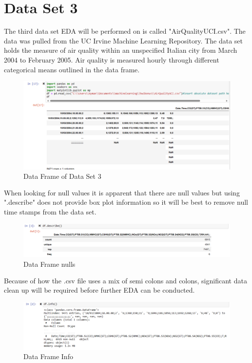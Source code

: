 \documentclass{article}
\begin{document}
\section{Data Set 3}
The third data set EDA will be performed on is called "AirQualityUCI.csv". 
The data was pulled from the UC Irvine Machine Learning Repository. The data set holds the measure of air quality within an unspecified Italian city from March 2004 to February 2005. Air quality is measured hourly through different categorical means outlined in the data frame.
\begin{figure}
    \centering
    \includegraphics[width=0.5\linewidth]{d.png}
    \caption{Data Frame of Data Set 3}
    \label{fig:enter-label}
\end{figure}
When looking for null values it is apparent that there are null values but using ".describe" does not provide box plot information so it will be best to remove null time stamps from the data set. 
\begin{figure}
    \centering
    \includegraphics[width=0.5\linewidth]{e.png}
    \caption{Data Frame nulls}
    \label{fig:enter-label}
\end{figure}
Because of how the .csv file uses a mix of semi colons and colons, significant data clean up will be required before further EDA can be conducted.
\begin{figure}
    \centering
    \includegraphics[width=0.5\linewidth]{f.png}
    \caption{Data Frame Info}
    \label{fig:enter-label}
\end{figure}
\end{document}
